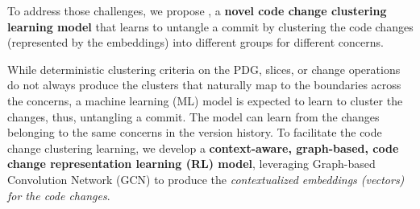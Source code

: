 


To address those challenges, we propose {\tool}, a {\bf novel code
  change clustering learning model} that learns to untangle a commit
by clustering the code changes (represented by the embeddings) into
different groups for different concerns.

While deterministic clustering criteria on the PDG, slices, or change
operations do not always produce the clusters that naturally map to
the boundaries across the concerns, a machine learning (ML) model is
expected to learn to cluster the changes, thus, untangling a
commit. The model can learn from the changes belonging to the same
concerns in the version history. To facilitate the code change
clustering learning, we develop a {\bf context-aware, graph-based,
  code change representation learning (RL) model}, leveraging
Graph-based Convolution Network (GCN) to produce the {\em contextualized
  embeddings (vectors) for the code changes}.

